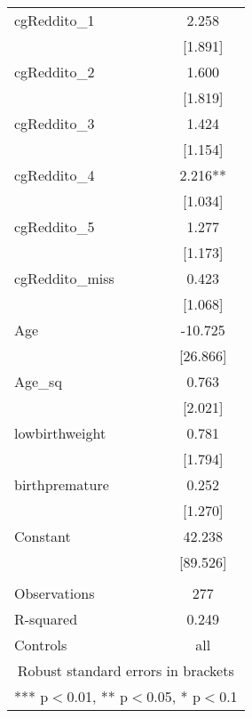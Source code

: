 \documentclass[]{article}
\begin{document}
\begin{tabular}{lc}
cgReddito\_1 & 2.258 \\
 & [1.891] \\
cgReddito\_2 & 1.600 \\
 & [1.819] \\
cgReddito\_3 & 1.424 \\
 & [1.154] \\
cgReddito\_4 & 2.216** \\
 & [1.034] \\
cgReddito\_5 & 1.277 \\
 & [1.173] \\
cgReddito\_miss & 0.423 \\
 & [1.068] \\
Age & -10.725 \\
 & [26.866] \\
Age\_sq & 0.763 \\
 & [2.021] \\
lowbirthweight & 0.781 \\
 & [1.794] \\
birthpremature & 0.252 \\
 & [1.270] \\
Constant & 42.238 \\
 & [89.526] \\
 &  \\
Observations & 277 \\
R-squared & 0.249 \\
 Controls & all \\ \hline
\multicolumn{2}{c}{ Robust standard errors in brackets} \\
\multicolumn{2}{c}{ *** p$<$0.01, ** p$<$0.05, * p$<$0.1} \\
\end{tabular}
\end{document}
